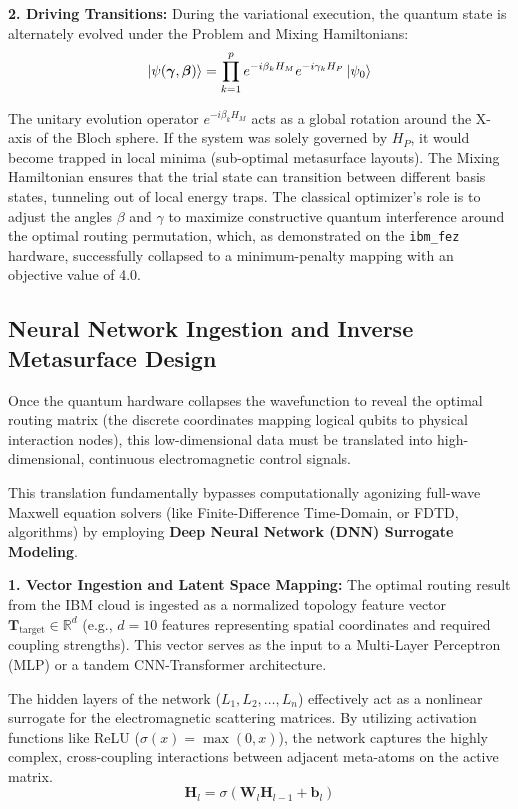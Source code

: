 \documentclass[11pt, a4paper]{article}
\begin{document}
\textbf{2. Driving Transitions:}
During the variational execution, the quantum state is alternately evolved under the Problem and Mixing Hamiltonians:
\begin{equation}
\ket{\psi(\boldsymbol{\gamma}, \boldsymbol{\beta})} = \prod_{k=1}^{p} e^{-i\beta_k H_M} e^{-i\gamma_k H_P} \ket{\psi_0}
\end{equation}

The unitary evolution operator $e^{-i\beta_k H_M}$ acts as a global rotation around the X-axis of the Bloch sphere. If the system was solely governed by $H_P$, it would become trapped in local minima (sub-optimal metasurface layouts). The Mixing Hamiltonian ensures that the trial state can transition between different basis states, tunneling out of local energy traps. The classical optimizer's role is to adjust the angles $\beta$ and $\gamma$ to maximize constructive quantum interference around the optimal routing permutation, which, as demonstrated on the \texttt{ibm\_fez} hardware, successfully collapsed to a minimum-penalty mapping with an objective value of 4.0.

\subsection{Neural Network Ingestion and Inverse Metasurface Design}

Once the quantum hardware collapses the wavefunction to reveal the optimal routing matrix (the discrete coordinates mapping logical qubits to physical interaction nodes), this low-dimensional data must be translated into high-dimensional, continuous electromagnetic control signals.

This translation fundamentally bypasses computationally agonizing full-wave Maxwell equation solvers (like Finite-Difference Time-Domain, or FDTD, algorithms) by employing \textbf{Deep Neural Network (DNN) Surrogate Modeling}.

\textbf{1. Vector Ingestion and Latent Space Mapping:}
The optimal routing result from the IBM cloud is ingested as a normalized topology feature vector $\mathbf{T}_{\mathrm{target}} \in \mathbb{R}^d$ (e.g., $d=10$ features representing spatial coordinates and required coupling strengths). This vector serves as the input to a Multi-Layer Perceptron (MLP) or a tandem CNN-Transformer architecture.

The hidden layers of the network ($L_1, L_2, \dots, L_n$) effectively act as a nonlinear surrogate for the electromagnetic scattering matrices. By utilizing activation functions like ReLU ($\sigma(x) = \max(0, x)$), the network captures the highly complex, cross-coupling interactions between adjacent meta-atoms on the active matrix.
\begin{equation}
\mathbf{H}_l = \sigma(\mathbf{W}_l \mathbf{H}_{l-1} + \mathbf{b}_l)
\end{equation}
\end{document}
